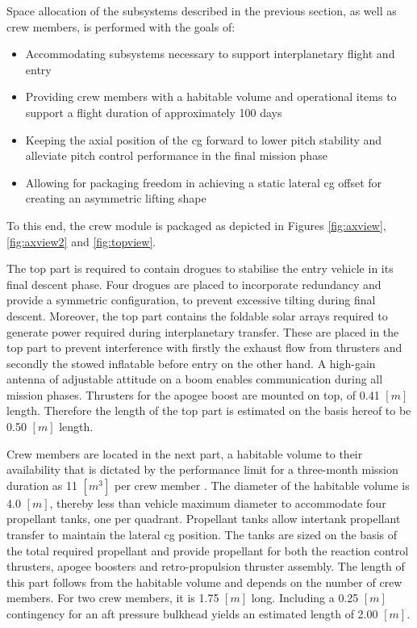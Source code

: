 Space allocation of the subsystems described in the previous section, as well as crew members, is performed with the goals of:
\begin{itemize}
\item Accommodating subsystems necessary to support interplanetary flight and entry
\item Providing crew members with a habitable volume and operational items to support a flight duration of approximately 100 days
\item Keeping the axial position of the \gls{cg} forward to lower pitch stability and alleviate pitch control performance in the final mission phase
\item Allowing for packaging freedom in achieving a static lateral \gls{cg} offset for creating an asymmetric lifting shape
\end{itemize}
To this end, the crew module is packaged as depicted in Figures \ref{fig:axview}, \ref{fig:axview2} and \ref{fig:topview}. 

The top part is required to contain drogues to stabilise the entry vehicle in its final descent phase. Four drogues are placed to incorporate redundancy and provide a symmetric configuration, to prevent excessive tilting during final descent. Moreover, the top part contains the foldable solar arrays required to generate power required during interplanetary transfer. These are placed in the top part to prevent interference with firstly the exhaust flow from thrusters and secondly the stowed inflatable before entry on the other hand. A high-gain antenna of adjustable attitude on a boom enables communication during all mission phases. Thrusters for the apogee boost are mounted on top, of 0.41 $[m]$ length. Therefore the length of the top part is estimated on the basis hereof to be 0.50 $[m]$ length.

Crew members are located in the next part, a habitable volume to their availability that is dictated by the performance limit for a three-month mission duration as 11 $[m^{3}]$ per crew member \cite{Rudisill2008}. The diameter of the habitable volume is 4.0 $[m]$, thereby less than vehicle maximum diameter to accommodate four propellant tanks, one per quadrant. Propellant tanks allow intertank propellant transfer to maintain the lateral \gls{cg} position. The tanks are sized on the basis of the total required propellant and provide propellant for both the reaction control thrusters, apogee boosters and retro-propulsion thruster assembly. The length of this part follows from the habitable volume and depends on the number of crew members. For two crew members, it is 1.75 $[m]$ long. Including a 0.25 $[m]$ contingency for an aft pressure bulkhead yields an estimated length of 2.00 $[m]$.

